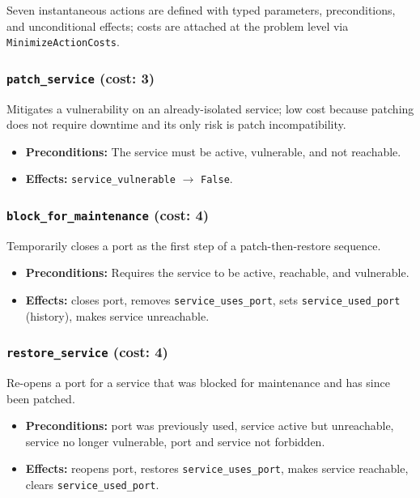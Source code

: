 \documentclass[12pt,a4paper]{article}
\begin{document}
	Seven instantaneous actions are defined with typed parameters, preconditions, and unconditional
	effects; costs are attached at the problem level via \texttt{MinimizeActionCosts}.
	
	\subsubsection{\texttt{patch\_service} \quad (cost: 3)}
	
	Mitigates a vulnerability on an already-isolated service; low cost because patching does not
	require downtime and its only risk is patch incompatibility.
	\begin{itemize}[leftmargin=1.5em]
		\item \textbf{Preconditions:} The service must be active, vulnerable, and not reachable.
		\item \textbf{Effects:} \texttt{service\_vulnerable} $\rightarrow$ \texttt{False}.
	\end{itemize}
	
	\subsubsection{\texttt{block\_for\_maintenance} \quad (cost: 4)}
	
	Temporarily closes a port as the first step of a patch-then-restore sequence.
	\begin{itemize}[leftmargin=1.5em]
		\item \textbf{Preconditions:} Requires the service to be active, reachable, and vulnerable.
		\item \textbf{Effects:} closes port, removes \texttt{service\_uses\_port}, sets \texttt{service\_used\_port} (history), makes service unreachable.
	\end{itemize}
	
	\subsubsection{\texttt{restore\_service} \quad (cost: 4)}
	
	Re-opens a port for a service that was blocked for maintenance and has since been patched.
	\begin{itemize}[leftmargin=1.5em]
		\item \textbf{Preconditions:} port was previously used, service active but unreachable, service no longer vulnerable, port and service not forbidden.
		\item \textbf{Effects:} reopens port, restores \texttt{service\_uses\_port}, makes service reachable, clears \texttt{service\_used\_port}.
	\end{itemize}
	
\end{document}
